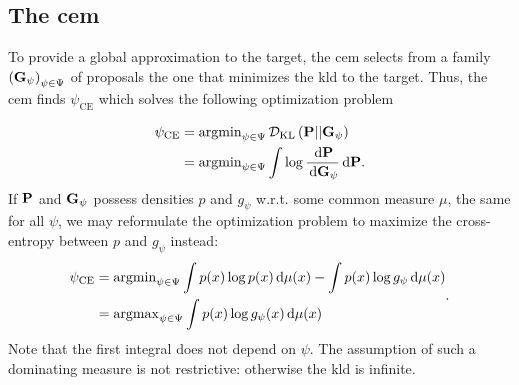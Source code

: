 \subsection{The \texorpdfstring{\Acrfull{cem}}{Cross-entropy method}}
\label{subsec:cem}
To provide a global approximation to the target, the \gls{cem}\citep{Rubinstein1999CrossEntropy,Rubinstein2004CrossEntropy} selects from a family $ \left( \G_{\psi} \right)_{\psi \in \Psi}$ of proposals the one that minimizes the \gls{kld} to the target. Thus, the \gls{cem} finds $\psi_{\text{CE}}$ which solves the following optimization problem

\begin{align*}
    \psi_{\text{CE}} &= \argmin_{\psi \in \Psi} \Dkl{\P}{\G_{\psi}} \\
    &= \argmin_{\psi \in \Psi} \int \log \frac{\d \P}{\d\G_{\psi}} \d \P.
\end{align*}
If $\P$ and $\G_{\psi}$ possess densities $p$ and $g_{\psi}$ w.r.t. some common measure $\mu$, the same for all $\psi$, we may reformulate the optimization problem to maximize the cross-entropy between $p$ and $g_{\psi}$ instead:
\begin{align}
    \begin{split}
    \psi_{\text{CE}} &= \argmin_{\psi \in \Psi} \int  p(x)\log p(x) \d \mu(x) - \int p(x)\log g_{\psi} \d \mu(x) \\ 
    &= \argmax_{\psi \in \Psi} \int p(x) \log g_{\psi}(x) \d \mu(x)
    \end{split} \label{eq:ce_argmax}.
\end{align}
Note that the first integral does not depend on $\psi$. The assumption of such a dominating measure is not restrictive: otherwise the \gls{kld} is infinite. 

